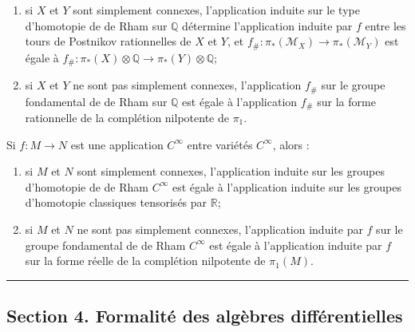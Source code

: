 \documentclass[
  french,
  a3paper,
  a3paper]{extarticle}
\begin{document}
\begin{enumerate}
\def\labelenumi{\arabic{enumi})}
\item
  si \(X\) et \(Y\) sont simplement connexes, l'application induite sur
  le type d'homotopie de de Rham sur \(\mathbb Q\) détermine
  l'application induite par \(f\) entre les tours de Postnikov
  rationnelles de \(X\) et \(Y\), et
  \(f_\#: \pi_*(\mathcal M_X)\longrightarrow\pi_*(\mathcal M_Y)\) est
  égale à
  \(f_\#: \pi_*(X)\otimes\mathbb Q\longrightarrow\pi_*(Y)\otimes\mathbb Q\);
\item
  si \(X\) et \(Y\) ne sont pas simplement connexes, l'application
  \(f_\#\) sur le groupe fondamental de de Rham sur \(\mathbb Q\) est
  égale à l'application \(f_\#\) sur la forme rationnelle de la
  complétion nilpotente de \(\pi_1\).
\end{enumerate}

Si \(f:M\longrightarrow N\) est une application \(C^\infty\) entre
variétés \(C^\infty\), alors :

\begin{enumerate}
\def\labelenumi{\arabic{enumi})}
\item
  si \(M\) et \(N\) sont simplement connexes, l'application induite sur
  les groupes d'homotopie de de Rham \(C^\infty\) est égale à
  l'application induite sur les groupes d'homotopie classiques
  tensorisés par \(\mathbb R\);
\item
  si \(M\) et \(N\) ne sont pas simplement connexes, l'application
  induite par \(f\) sur le groupe fondamental de de Rham \(C^\infty\)
  est égale à l'application induite par \(f\) sur la forme réelle de la
  complétion nilpotente de \(\pi_1(M)\).
\end{enumerate}

\clearpage



\par

\vspace{0.7mm}\hrule\vspace{1.6mm}

\fontsize{9}{11}\selectfont

\subsection{Section 4. Formalité des algèbres
différentielles}\label{section-4.-formalituxe9-des-alguxe8bres-diffuxe9rentielles}
\end{document}
